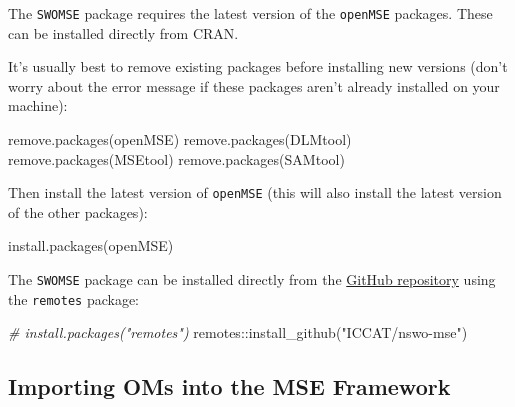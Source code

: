 \documentclass[
]{article}
\newenvironment{Shaded}{\begin{snugshade}}{\end{snugshade}}
\newcommand{\CommentTok}[1]{\textcolor[rgb]{0.56,0.35,0.01}{\textit{#1}}}
\newcommand{\FunctionTok}[1]{\textcolor[rgb]{0.00,0.00,0.00}{#1}}
\newcommand{\NormalTok}[1]{#1}
\newcommand{\SpecialCharTok}[1]{\textcolor[rgb]{0.00,0.00,0.00}{#1}}
\newcommand{\StringTok}[1]{\textcolor[rgb]{0.31,0.60,0.02}{#1}}
\begin{document}
The \texttt{SWOMSE} package requires the latest version of the \texttt{openMSE} packages. These can be installed directly from CRAN.

It's usually best to remove existing packages before installing new versions (don't worry about the error message if these packages aren't already installed on your machine):

\begin{Shaded}
\begin{Highlighting}[]
\FunctionTok{remove.packages}\NormalTok{(}\StringTok{\textquotesingle{}openMSE\textquotesingle{}}\NormalTok{)}
\FunctionTok{remove.packages}\NormalTok{(}\StringTok{\textquotesingle{}DLMtool\textquotesingle{}}\NormalTok{)}
\FunctionTok{remove.packages}\NormalTok{(}\StringTok{\textquotesingle{}MSEtool\textquotesingle{}}\NormalTok{)}
\FunctionTok{remove.packages}\NormalTok{(}\StringTok{\textquotesingle{}SAMtool\textquotesingle{}}\NormalTok{)}
\end{Highlighting}
\end{Shaded}

Then install the latest version of \texttt{openMSE} (this will also install the latest version of the other packages):

\begin{Shaded}
\begin{Highlighting}[]
\FunctionTok{install.packages}\NormalTok{(}\StringTok{\textquotesingle{}openMSE\textquotesingle{}}\NormalTok{)}
\end{Highlighting}
\end{Shaded}

The \texttt{SWOMSE} package can be installed directly from the \href{https://github.com/ICCAT/nswo-mse}{GitHub repository} using the \texttt{remotes} package:

\begin{Shaded}
\begin{Highlighting}[]
\CommentTok{\# install.packages("remotes")}
\NormalTok{remotes}\SpecialCharTok{::}\FunctionTok{install\_github}\NormalTok{(}\StringTok{"ICCAT/nswo{-}mse"}\NormalTok{)}
\end{Highlighting}
\end{Shaded}

\hypertarget{importing-oms-into-mse-framework}{%
\subsection{Importing OMs into the MSE Framework}\label{importing-oms-into-mse-framework}}
\end{document}
